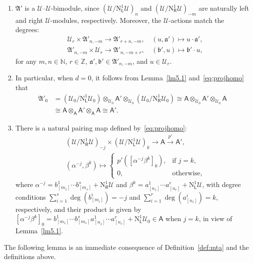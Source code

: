 \documentclass[12pt,a4paper,reqno]{amsart}
\numberwithin{equation}{section}
\theoremstyle{definition}
\newcommand{\N}{\mathbb{N}}
\newcommand{\Z}{\mathbb{Z}}
\def\L{\mathsf{L}}
\def\R{\mathsf{R}}
\def \al{\alpha}
\def \b{\beta}
\def\o{\otimes}
\def\ra{\rightarrow}
\def\scrU{\mathscr{U}}
\def\fA{\mathfrak{A}}
\def\rN{\mathrm{N}}
\def\A{\mathsf{A}}
\def\fa{\mathfrak{a}}
\def\fb{\mathfrak{b}}
\begin{document}
\begin{enumerate}
    \item  $\fA'$ is a $\scrU$--$\scrU$-bimodule, since $(\scrU/\rN^1_\L\scrU)_n$ and $(\scrU/\rN^1_\R\scrU)_{-m}$ are naturally left and right $\scrU$-modules, respectively. Moreover, the $\scrU$-actions match the degrees:  
\begin{align*}
    &\scrU_r\times \fA'_{n,-m}\ra \fA'_{r+n,-m},\quad (u,\fa')\mapsto u\cdot \fa',\\
    & \fA'_{n,-m}\times \scrU_{r}\ra \fA'_{n,-m+r},\quad (\fb',u)\mapsto \fb'\cdot u,
\end{align*}
for any $m,n\in \N$, $r\in \Z$, $\fa',\fb'\in \fA'_{n,-m}$, and $u\in \scrU_r$.
\item In particular, when $d=0$, it follows from Lemma~\ref{lm5.1} and~\eqref{eq:projhomo} that
\begin{equation}\label{eq:fA0identification}
    \begin{aligned}
    \fA'_0&=(\scrU_0/\rN^1_\L\scrU_0)\o _{\scrU_0} \A'\o_{\scrU_0} (\scrU_0/\rN^1_\R\scrU_0)\cong \A\o _{\scrU_0}\A'\o_{\scrU_0}\A\\
&\cong \A\o _{\A}\A'\o_{\A}\A \cong \A'.
    \end{aligned}
\end{equation}
\item There is a natural pairing map defined by~\eqref{eq:projhomo}:
\begin{equation}\label{eq:pairing}
\begin{aligned}
&(\scrU/\rN^1_\R\scrU)_{-j}\times (\scrU/\rN^1_\L\scrU)_k\ra \A\xrightarrow{p'}\A',\\
& (\al^{-j},\b^k)\mapsto \begin{cases}
p'([\al^{-j}\b^k]_0),&\text{if }j=k,\\
0,& \text{otherwise},
\end{cases}
\end{aligned}
\end{equation}
where $\al^{-j}=b^1_{[m_1]}\cdots b^s_{[m_s]}+\rN^1_\R \scrU $ and $\b^{k}=a^1_{[n_1]}\cdots a^r_{[n_r]}+\rN^1_\L \scrU$, with degree conditions $\sum_{i=1}^s \deg(b^i_{[m_i]})=-j$ and $\sum_{i=1}^r \deg(a^i_{[n_i]})=k$, respectively, and their product is given by $[\al^{-j}\b^k]_0=b^1_{[m_1]}\cdots b^s_{[m_s]}a^1_{[n_1]}\cdots a^r_{[n_r]}+\rN^1_\L\scrU_0\in \A$ when $j=k$, in view of Lemma~\ref{lm5.1}. 
\end{enumerate}
 



The following lemma is an immediate consequence of Definition~\ref{def:mta} and the definitions above.
\end{document}
